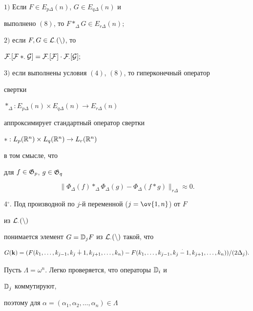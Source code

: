 \begin{thm} $1)$ Если $F\in E_{p\Delta}(n)$, $G\in E_{q\Delta}(n)$ и 


выполнено $(8)$, то $F*_\Delta G\in E_{r\Delta}(n);$ 


 


$2)$ если $F,G\in\cal L_\Delta(n)$, то 


$\cal F_\Delta[F*_\Delta G]=\cal F_\Delta[F]\cdot\cal F_\Delta[G];$ 


 


$3)$ если выполнены условия $(4)$, $(8)$, то гиперконечный оператор 


свертки 


$*_\Delta:E_{p\Delta}(n)\times E_{q\Delta}(n)\to E_{r\Delta}(n)$ 


аппроксимирует стандартный оператор свертки 


$*:L_p(\Bbb R^n)\times L_q(\Bbb R^n)\to L_r(\Bbb R^n)$ 


в том смысле, что 


для $f\in\frak G_p$, $g\in\frak G_q$ 


$$ 


\|\Phi_\Delta(f)*_\Delta\Phi_\Delta(g)-\Phi_\Delta(f*g) 


\|_{r\Delta}\approx 0. 


$$ 


\end{thm} 


 


4${}^\circ$. Под производной по $j$-й переменной ($j=\ov{1,n}$) от $F$ 


из $\cal L_\Delta(n)$ 


понимается элемент $G=\Bbb D_j F$ из $\cal L_\Delta(n)$ такой, что 


$$ 


G(\bold k)=(F(k_1,\dotsc,k_{j-1},k_j\dotplus 1, 


k_{j+1},\dotsc,k_n)- 


F(k_1,\dotsc,k_{j-1},k_j\dotminus 1, 


k_{j+1},\dotsc,k_n))/(2\Delta_j). 


$$ 


 


Пусть $\Lambda=\omega^n$. Легко проверяется, что операторы $\Bbb D_i$ и 


$\Bbb D_j$ коммутируют, 


поэтому для $\alpha=(\alpha_1,\alpha_2,\dotsc,\alpha_n)\in\Lambda$ 


